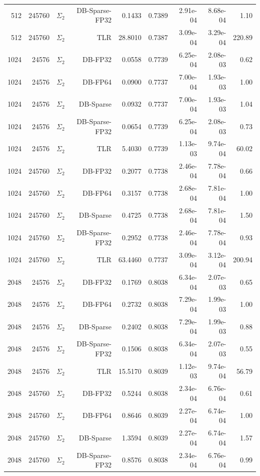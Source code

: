 \begin{tabular}{|r|r|r|r|r|r|r|r|r|}
  512 & 245760 & $\Sigma_2$ & DB-Sparse-FP32 & 0.1433 & 0.7389 & 2.91e-04 & 8.68e-04 & 1.10 \\
  512 & 245760 & $\Sigma_2$ & TLR & 28.8010 & 0.7387 & 3.09e-04 & 3.29e-04 & 220.89 \\
  1024 & 24576 & $\Sigma_2$ & DB-FP32 & 0.0558 & 0.7739 & 6.25e-04 & 2.08e-03 & 0.62 \\
  1024 & 24576 & $\Sigma_2$ & DB-FP64 & 0.0900 & 0.7737 & 7.00e-04 & 1.93e-03 & 1.00 \\
  1024 & 24576 & $\Sigma_2$ & DB-Sparse & 0.0932 & 0.7737 & 7.00e-04 & 1.93e-03 & 1.04 \\
  1024 & 24576 & $\Sigma_2$ & DB-Sparse-FP32 & 0.0654 & 0.7739 & 6.25e-04 & 2.08e-03 & 0.73 \\
  1024 & 24576 & $\Sigma_2$ & TLR & 5.4030 & 0.7739 & 1.13e-03 & 9.74e-04 & 60.02 \\
  1024 & 245760 & $\Sigma_2$ & DB-FP32 & 0.2077 & 0.7738 & 2.46e-04 & 7.78e-04 & 0.66 \\
  1024 & 245760 & $\Sigma_2$ & DB-FP64 & 0.3157 & 0.7738 & 2.68e-04 & 7.81e-04 & 1.00 \\
  1024 & 245760 & $\Sigma_2$ & DB-Sparse & 0.4725 & 0.7738 & 2.68e-04 & 7.81e-04 & 1.50 \\
  1024 & 245760 & $\Sigma_2$ & DB-Sparse-FP32 & 0.2952 & 0.7738 & 2.46e-04 & 7.78e-04 & 0.93 \\
  1024 & 245760 & $\Sigma_2$ & TLR & 63.4460 & 0.7737 & 3.09e-04 & 3.12e-04 & 200.94 \\
  2048 & 24576 & $\Sigma_2$ & DB-FP32 & 0.1769 & 0.8038 & 6.34e-04 & 2.07e-03 & 0.65 \\
  2048 & 24576 & $\Sigma_2$ & DB-FP64 & 0.2732 & 0.8038 & 7.29e-04 & 1.99e-03 & 1.00 \\
  2048 & 24576 & $\Sigma_2$ & DB-Sparse & 0.2402 & 0.8038 & 7.29e-04 & 1.99e-03 & 0.88 \\
  2048 & 24576 & $\Sigma_2$ & DB-Sparse-FP32 & 0.1506 & 0.8038 & 6.34e-04 & 2.07e-03 & 0.55 \\
  2048 & 24576 & $\Sigma_2$ & TLR & 15.5170 & 0.8039 & 1.12e-03 & 9.74e-04 & 56.79 \\
  2048 & 245760 & $\Sigma_2$ & DB-FP32 & 0.5244 & 0.8038 & 2.34e-04 & 6.76e-04 & 0.61 \\
  2048 & 245760 & $\Sigma_2$ & DB-FP64 & 0.8646 & 0.8039 & 2.27e-04 & 6.74e-04 & 1.00 \\
  2048 & 245760 & $\Sigma_2$ & DB-Sparse & 1.3594 & 0.8039 & 2.27e-04 & 6.74e-04 & 1.57 \\
  2048 & 245760 & $\Sigma_2$ & DB-Sparse-FP32 & 0.8576 & 0.8038 & 2.34e-04 & 6.76e-04 & 0.99 \\

\end{tabular}
